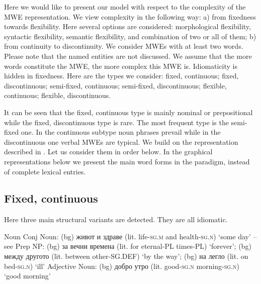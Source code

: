 \documentclass[output=paper,colorlinks,citecolor=brown]{langscibook}
\begin{document}
Here we would like to present our model with respect to the complexity of the MWE representation. We view complexity in the following way: a) from fixedness towards flexibility. Here several options are considered: morphological flexibility, syntactic flexibility, semantic flexibility, and combination of two or all of them; b) from continuity to discontinuity. We consider MWEs with at least two words. Please note that the named entities are not discussed. We assume that the more words constitute the MWE, the more complex this MWE is. Idiomaticity is hidden in fixedness. 
Here are the types we consider: fixed, continuous; fixed, discontinuous; semi-fixed, continuous; semi-fixed, discontinuous; flexible, continuous; flexible, discontinuous.

It can be seen that the fixed, continuous type is mainly nominal or prepositional while the fixed, discontinuous type is rare. The most frequent type is the semi-fixed one. In the continuous subtype noun phrases prevail while in the discontinuous one verbal MWEs are typical. We build on the representation described in \citet{simov-osenova-2015-catena, simov-osenova-2015-catenaKorea}. Let us consider them in order below. In the graphical representations below we present the main word forms in the paradigm, instead of complete lexical entries.


\subsection{Fixed, continuous}


Here three main structural variants are detected. They are all idiomatic.\largerpage

\ea \label{Ex:ZhivotIZdrave} Noun Conj Noun: (bg) {живот и здраве } (lit. life-\textsc{sg.m} and health-\textsc{sg.n}) {`some day'} -- see 
\ex \label{Ex:ZaVechniVremena} Prep NP:
    \ea (bg) {за вечни времена } (lit. for eternal-PL times-PL) {`forever'}; 
    \ex (bg) {между другото } (lit. between other-SG.DEF) {`by the way'}; 
    \ex (bg) {на легло } (lit. on bed-\textsc{sg.n}) {`ill'}
    \z
\ex \label{Ex:DobroUutro} Adjective Noun: 
    (bg) {добро утро } (lit. good-\textsc{sg.n} morning-\textsc{sg.n}) {`good morning'}
\z
\end{document}
